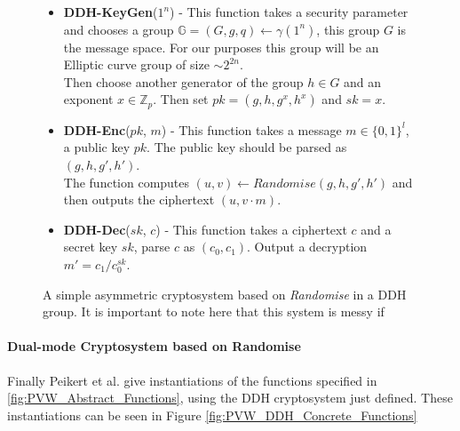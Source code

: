 \documentclass[ %
                    author={Nicholas Tutte},
                supervisor={Prof. Nigel Smart},
                    degree={MEng},
                     title={Secure Two Party Computation},
                  subtitle={A practical comparison of recent protocols},
                      type={Research - GG1K},
                      year={2015} ]{dissertation}
\begin{document}
					\begin{figure}[!htb]
						\begin{mdframed}
							\centering
							\begin{itemize}
								\item \textbf{DDH-KeyGen}($1^n$) - This function takes a security parameter and chooses a group $\mathbb{G} = (G, g, q) \leftarrow \gamma(1^n)$, this group $G$ is the message space. For our purposes this group will be an Elliptic curve group of size $\sim2^{2n}$.\\[0.25cm]

								Then choose another generator of the group $h \in G$ and an exponent $x \in \mathbb{Z}_p$. Then set $pk = (g, h, g^x, h^x)$ and $sk = x$. 

								\item \textbf{DDH-Enc}($pk$, $m$) - This function takes a message $m \in \{0, 1\}^l$, a public key $pk$. The public key should be parsed as $(g, h, g', h')$.\\[0.25cm]

								The function computes $(u, v) \leftarrow Randomise(g, h, g', h')$ and then outputs the ciphertext $(u, v \cdot m)$.

								\item \textbf{DDH-Dec}($sk$, $c$) - This function takes a ciphertext $c$ and a secret key $sk$, parse $c$ as $(c_0, c_1)$. Output a decryption $m' = c_1 / c_0^{sk}$.

							\end{itemize}
						\end{mdframed}

						\caption{A simple asymmetric cryptosystem based on \emph{Randomise} in a DDH group. It is important to note here that this system is messy if  \label{fig:DDH_Cryptosystem}}
					\end{figure}


					\paragraph{Dual-mode Cryptosystem based on Randomise} Finally Peikert et al. give instantiations of the functions specified in \ref{fig:PVW_Abstract_Functions}, using the DDH cryptosystem just defined. These instantiations can be seen in Figure \ref{fig:PVW_DDH_Concrete_Functions}\\
\end{document}
